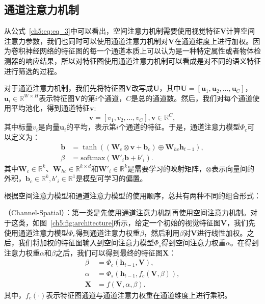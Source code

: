 \subsection{通道注意力机制}
从公式~\ref{ch5:eq:eq_3}中可以看出，空间注意力机制需要使用视觉特征$\bm{V}$计算空间注意力参数，我们也同时可以使用通道注意力机制对$\bm{V}$在通道维度上进行加权。因为卷积神经网络的特征图的每一个通道本质上可以认为是一种特定属性或者物体检测器的响应结果，所以对特征图使用通道注意力机制可以看成是对不同的语义特征进行筛选的过程。

对于通道注意力机制，我们先将特征图$\bm{V}$改写成$\bm{U}$，其中$\bm{U} = [\bm{u}_1, \bm{u}_2, ..., \bm{u}_C]$，$\bm{u}_i \in \mathbb{R}^{W \times H}$表示特征图$\bm{V}$的第$i$个通道，$C$是总的通道数。然后，我们对每个通道使用平均池化，得到通道特征$\bm{v}$:
\begin{equation}
\bm{v} = \left[v_1, v_2, ..., v_C \right], \bm{v} \in \mathbb{R}^{C},
\end{equation}
其中标量$v_i$是向量$\bm{u}_i$的平均，表示第$i$个通道的特征。于是，通道注意力模型$\Phi_c$可以定义为：
\begin{equation} \label{ch5:eq:eq_7}
\begin{split}
\bm{b} & = \tanh \left(\left(\bm{W}_c \otimes \bm{v} + \bm{b}_c \right) \oplus \bm{W}_{hc}\bm{h}_{t-1} \right), \\
\beta & = \textrm{softmax} \left(\bm{W'}_i \bm{b} + {b'}_i \right).
\end{split}
\end{equation}
其中$\bm{W}_c \in \mathbb{R}^k$、$\bm{W}_{hc} \in \mathbb{R}^{k \times d}$和$\bm{W'}_i \in \mathbb{R}^k$是需要学习的映射矩阵，$\otimes$表示向量间的外积，$\bm{b}_c \in \mathbb{R}^k, {b'}_i \in \mathbb{R}^1$是模型可学习的偏置。


根据空间注意力模型和通道注意力模型的使用顺序，总共有两种不同的组合形式：

\textbf{}（Channel-Spatial）：第一类是先使用通道注意力机制再使用空间注意力机制。对于这类，如图~\ref{ch5:fig:architecture}所示，给定一个初始的视觉特征图$\bm{V}$，我们先使用通道注意力模型$\Phi_c$得到通道注意力权重$\beta$，然后利用$\beta$对$\bm{V}$进行线性加权。之后，我们将加权的特征图输入到空间注意力模型$\Phi_s$得到空间注意力权重$\alpha$。在得到注意力权重$\alpha$和$\beta$之后，我们可以得到最终的特征图$\bm{X}$：
\begin{equation} \label{ch5:eq:eq_8}
\begin{split}
\beta &= \Phi_c \left(\bm{h}_{t-1},\bm{V} \right), \\
\alpha &= \Phi_s \left(\bm{h}_{t-1}, f_c \left(\bm{V}, \beta \right) \right), \\
\bm{X} &= f \left(\bm{V}, \alpha, \beta \right).
\end{split}
\end{equation}
其中，$f_c(\cdot)$表示特征图通道与通道注意力权重在通道维度上进行乘积。


